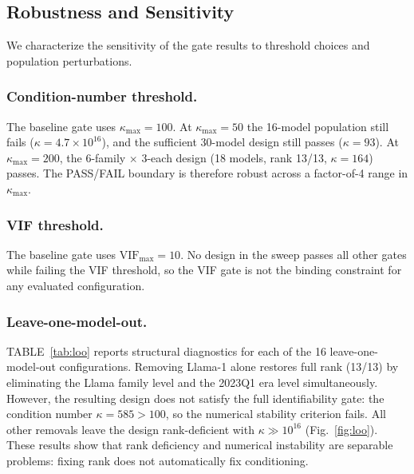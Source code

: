 \documentclass{ieeeaccess}
\theoremstyle{definition}
\theoremstyle{plain}
\begin{document}
\subsection{Robustness and Sensitivity}
We characterize the sensitivity of the gate results to threshold choices and population perturbations.

\subsubsection{Condition-number threshold.} The baseline gate uses $\kappa_{\max} = 100$. At $\kappa_{\max} = 50$ the 16-model population still fails ($\kappa = 4.7 \times 10^{16}$), and the sufficient 30-model design still passes ($\kappa = 93$). At $\kappa_{\max} = 200$, the 6-family $\times$ 3-each design (18 models, rank 13/13, $\kappa = 164$) passes. The PASS/FAIL boundary is therefore robust across a factor-of-4 range in $\kappa_{\max}$.

\subsubsection{VIF threshold.} The baseline gate uses $\text{VIF}_{\max} = 10$. No design in the sweep passes all other gates while failing the VIF threshold, so the VIF gate is not the binding constraint for any evaluated configuration.

\subsubsection{Leave-one-model-out.} TABLE~\ref{tab:loo} reports structural diagnostics for each of the 16 leave-one-model-out configurations. Removing Llama-1 alone restores full rank (13/13) by eliminating the Llama family level and the 2023Q1 era level simultaneously. However, the resulting design does not satisfy the full identifiability gate: the condition number $\kappa = 585 > 100$, so the numerical stability criterion fails. All other removals leave the design rank-deficient with $\kappa \gg 10^{16}$ (Fig.~\ref{fig:loo}). These results show that rank deficiency and numerical instability are separable problems: fixing rank does not automatically fix conditioning.
\end{document}
